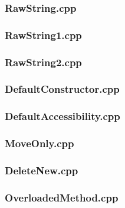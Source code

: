 \documentclass[11pt,]{report}
\begin{document}
\begin{appendix}
\subsubsection{RawString.cpp}
\label{sub:RawString}


\subsubsection{RawString1.cpp}
\label{sub:RawString1}


\subsubsection{RawString2.cpp}
\label{sub:RawString2}


\subsubsection{DefaultConstructor.cpp}
\label{sub:DefaultConstructor}


\subsubsection{DefaultAccessibility.cpp}
\label{sub:DefaultAccessibility}


\subsubsection{MoveOnly.cpp}
\label{sub:MoveOnly}


\subsubsection{DeleteNew.cpp}
\label{sub:DeleteNew}


\subsubsection{OverloadedMethod.cpp}
\label{sub:OverloadedMethod.cpp}



\end{appendix}
\end{document}

